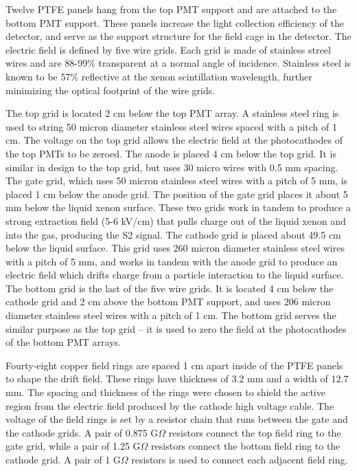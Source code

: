 Twelve PTFE panels hang from the top PMT support and are attached to the bottom PMT support.  These panels increase the light collection efficiency of the detector, and serve as the support structure for the field cage in the detector.  The electric field is defined by five wire grids.  Each grid is made of stainless streel wires and are 88-99\% transparent at a normal angle of incidence.  Stainless steel is known to be 57\% reflective at the xenon scintillation wavelength, further minimizing the optical footprint of the wire grids.

The top grid is located 2 cm below the top PMT array.  A stainless steel ring is used to string 50 micron diameter stainless steel wires spaced with a pitch of 1 cm.  The voltage on the top grid allows the electric field at the photocathodes of the top PMTs to be zeroed.  The anode is placed 4 cm below the top grid.  It is similar in design to the top grid, but uses 30 micro wires with 0.5 mm spacing. The gate grid, which uses 50 micron stainless steel wires with a pitch of 5 mm, is placed 1 cm below the anode grid. The position of the gate grid places it about 5 mm below the liquid xenon surface.   These two grids work in tandem to produce a strong extraction field (5-6 kV/cm) that pulls charge out of the liquid xenon and into the gas, producing the S2 signal. The cathode grid is placed about 49.5 cm below the liquid surface. This grid uses 260 micron diameter stainless steel wires with a pitch of 5 mm, and works in tandem with the anode grid to produce an electric field which drifts charge from a particle interaction to the liquid surface.  The bottom grid is the last of the five wire grids.  It is located 4 cm below the cathode grid and 2 cm above the bottom PMT support, and uses 206 micron diameter stainless steel wires with a pitch of 1 cm.  The bottom grid serves the similar purpose as the top grid – it is used to zero the field at the photocathodes of the bottom PMT arrays.

Fourty-eight copper field rings are spaced 1 cm apart inside of the PTFE panels to shape the drift field. These rings have thickness of 3.2 mm and a width of 12.7 mm.  The spacing and thickness of the rings were chosen to shield the active region from the electric field produced by the cathode high voltage cable.  The voltage of the field rings is set by a resistor chain that runs between the gate and the cathode grids.  A pair of  0.875 G$\Omega$ resistors connect the top field ring to the gate grid, while a pair of 1.25 G$\Omega$ resistors connect the bottom field ring to the cathode grid.  A pair of 1 G$\Omega$ resistors is used to connect each adjacent field ring.


